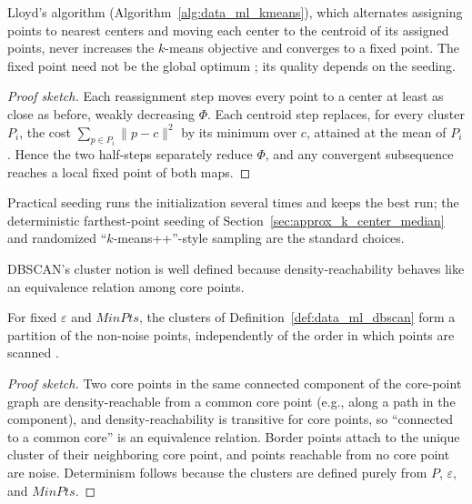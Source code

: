 \begin{theorem}\label{thm:data_ml_lloyd}
  Lloyd's algorithm (Algorithm~\ref{alg:data_ml_kmeans}), which alternates
  assigning points to nearest centers and moving each center to the centroid
  of its assigned points, never increases the $k$-means objective and
  converges to a fixed point. The fixed point need not be the global optimum
  \cite{lloyd1982}; its quality depends on the seeding.
\end{theorem}

\begin{proof}[Proof sketch]
  Each reassignment step moves every point to a center at least as close as
  before, weakly decreasing $\Phi$. Each centroid step replaces, for every
  cluster $P_i$, the cost $\sum_{p \in P_i}\|p - c\|^2$ by its minimum over
  $c$, attained at the mean of $P_i$. Hence the two half-steps separately
  reduce $\Phi$, and any convergent subsequence reaches a local fixed point
  of both maps.
\end{proof}

Practical seeding runs the initialization several times and keeps the best
run; the deterministic farthest-point seeding of
Section~\ref{sec:approx_k_center_median} and randomized
``$k$-means++''-style sampling are the standard choices.

DBSCAN's cluster notion is well defined because density-reachability behaves
like an equivalence relation among core points.

\begin{theorem}\label{thm:data_ml_dbscan_well_defined}
  For fixed $\varepsilon$ and $\mathit{MinPts}$, the clusters of
  Definition~\ref{def:data_ml_dbscan} form a partition of the non-noise
  points, independently of the order in which points are scanned
  \cite{ester1996}.
\end{theorem}

\begin{proof}[Proof sketch]
  Two core points in the same connected component of the core-point graph
  are density-reachable from a common core point (e.g., along a path in the
  component), and density-reachability is transitive for core points, so
  ``connected to a common core'' is an equivalence relation. Border points
  attach to the unique cluster of their neighboring core point, and points
  reachable from no core point are noise. Determinism follows because the
  clusters are defined purely from $P$, $\varepsilon$, and
  $\mathit{MinPts}$.
\end{proof}

